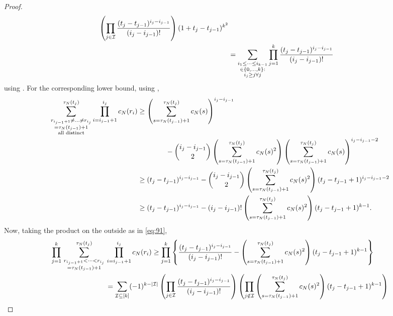 \documentclass{article}
\newcommand{\1}[1]{\mathbbm{1}_{#1}}
\begin{document}
\begin{proof}
\begin{align}
\left( \prod_{j\in\mathcal{I}} \frac{(t_j - t_{j-1})^{i_j - i_{j-1}}}{(i_j - i_{j-1})!}\right) 
(1+ t_j - t_{j-1})^{k^2} \notag\\
&= \sum_{\substack{i_1\leq \dots\leq i_{k-1}\\ \in \{0,\dots,k\} :\\ i_j \geq j \forall j}} \prod_{j=1}^k \frac{(t_j - t_{j-1})^{i_j - i_{j-1}}}{(i_j - i_{j-1})!}
\end{align}
using \citet[Equation (3.3)]{brown2021}.
For the corresponding lower bound, using \citet[(8)]{koskela2018},
\begin{align}
\sum_{\substack{ r_{i_{j-1}+1} \neq \dots \neq r_{i_j} \\ = \tau_N(t_{j-1})+1 \\ \text{all distinct}}}^{\tau_N(t_j)}
\prod_{i=i_{j-1}+1}^{i_j} c_N(r_i)
&\geq \left( \sum_{s=\tau_N(t_{j-1})+1}^{\tau_N(t_j)} c_N(s) \right)^{i_j - i_{j-1}} \notag\\
&\qquad\qquad- \binom{i_j - i_{j-1}}{2} \left( \sum_{s=\tau_N(t_{j-1})+1}^{\tau_N(t_j)} c_N(s)^2 \right)
\left( \sum_{s=\tau_N(t_{j-1})+1}^{\tau_N(t_j)} c_N(s) \right)^{i_j - i_{j-1} -2} \notag\\
&\geq (t_j - t_{j-1})^{i_j - i_{j-1}}
- \binom{i_j - i_{j-1}}{2} \left( \sum_{s=\tau_N(t_{j-1})+1}^{\tau_N(t_j)} c_N(s)^2 \right)
( t_j - t_{j-1} +1 )^{i_j - i_{j-1} -2} \notag\\
&\geq (t_j - t_{j-1})^{i_j - i_{j-1}}
- (i_j - i_{j-1})! \left( \sum_{s=\tau_N(t_{j-1})+1}^{\tau_N(t_j)} c_N(s)^2 \right)
( t_j - t_{j-1} +1 )^{k-1} .
\end{align}
Now, taking the product on the outside as in \eqref{eq:91}, 
\begin{align}
\prod_{j=1}^k \,
\sum_{\substack{ r_{i_{j-1}+1} < \dots < r_{i_j} \\ = \tau_N(t_{j-1})+1}}^{\tau_N(t_j)}  \,&\prod_{i=i_{j-1}+1}^{i_j} c_N(r_i)
\geq \prod_{j=1}^k \left\{ \frac{(t_j - t_{j-1})^{i_j - i_{j-1}}}{(i_j - i_{j-1})!}  
- \left( \sum_{s=\tau_N(t_{j-1})+1}^{\tau_N(t_j)} c_N(s)^2 \right)
( t_j - t_{j-1} +1 )^{k-1} \right\} \notag\\
&= \sum_{\mathcal{I} \subseteq [k]} (-1)^{k-|\mathcal{I}|} \left( \prod_{j\in\mathcal{I}} \frac{(t_j - t_{j-1})^{i_j - i_{j-1}}}{(i_j - i_{j-1})!} \right)
\left( \prod_{j\notin\mathcal{I}} \left( \sum_{s=\tau_N(t_{j-1})+1}^{\tau_N(t_j)} c_N(s)^2 \right) ( t_j - t_{j-1} +1 )^{k-1} \right) \notag\\

\end{align}
\end{proof}
\end{document}
